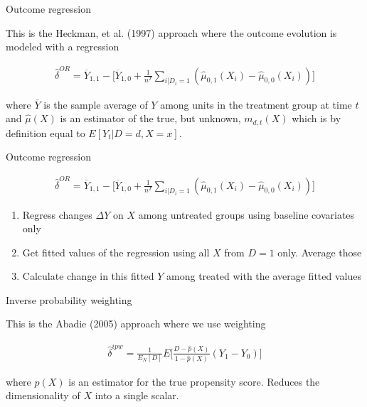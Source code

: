 \documentclass{beamer}
\begin{document}
\begin{frame}{Outcome regression}

This is the Heckman, et al. (1997) approach where the outcome evolution is modeled with a regression

\bigskip

\begin{eqnarray*}
\widehat{\delta}^{OR} = \overline{Y}_{1,1} - \bigg [ \overline{Y}_{1,0} + \frac{1}{n^T} \sum_{i|D_i=1} ( \widehat{\mu}_{0,1}(X_i) - \widehat{\mu}_{0,0}(X_i)) \bigg ]
\end{eqnarray*}

where $\overline{Y}$ is the sample average of $Y$ among units in the treatment group at time $t$ and $\widehat{\mu}(X)$ is an estimator of the true, but unknown, $m_{d,t}(X)$ which is by definition equal to $E[Y_t|D=d,X=x]$.

\end{frame}




\begin{frame}{Outcome regression}

\begin{eqnarray*}
\widehat{\delta}^{OR} = \overline{Y}_{1,1} - \bigg [ \overline{Y}_{1,0} + \frac{1}{n^T} \sum_{i|D_i=1} ( \widehat{\mu}_{0,1}(X_i) - \widehat{\mu}_{0,0}(X_i)) \bigg ]
\end{eqnarray*}

\begin{enumerate}
\item Regress changes $\Delta Y$ on $X$ among untreated groups using baseline covariates only
\item Get fitted values of the regression using all $X$ from $D=1$ only.  Average those
\item Calculate change in this fitted $Y$ among treated with the average fitted values
\end{enumerate}

\end{frame}

\begin{frame}{Inverse probability weighting}

This is the Abadie (2005) approach where we use weighting

\begin{eqnarray*}
\widehat{\delta}^{ipw} = \frac{1}{E_N[D]} E \bigg [ \frac{D-\widehat{p}(X)}{1-\widehat{p}(X)} (Y_1-Y_0) \bigg ]
\end{eqnarray*}

where $\widehat{p}(X)$ is an estimator for the true propensity score. Reduces the dimensionality of $X$ into a single scalar.

\end{frame}
\end{document}
